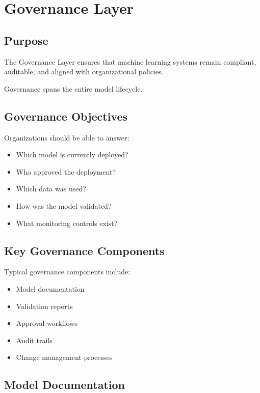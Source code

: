 \section{Governance Layer}

\subsection{Purpose}

The Governance Layer ensures that machine learning systems remain compliant, auditable, and aligned with organizational policies.

Governance spans the entire model lifecycle.

\subsection{Governance Objectives}

Organizations should be able to answer:

\begin{itemize}
    \item Which model is currently deployed?
    \item Who approved the deployment?
    \item Which data was used?
    \item How was the model validated?
    \item What monitoring controls exist?
\end{itemize}

\subsection{Key Governance Components}

Typical governance components include:

\begin{itemize}
    \item Model documentation
    \item Validation reports
    \item Approval workflows
    \item Audit trails
    \item Change management processes
\end{itemize}

\subsection{Model Documentation}


